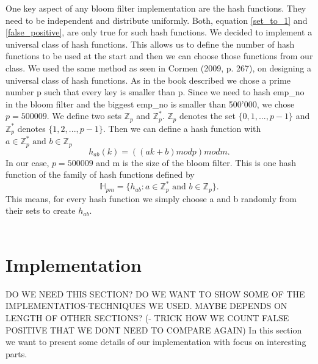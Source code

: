 \documentclass[12]{scrartcl}
\begin{document}
One key aspect of any bloom filter implementation are the hash functions. They need to be independent and distribute uniformly. Both, equation \ref{set_to_1} and \ref{false_positive}, are only true for such hash functions. We decided to implement a universal class of hash functions. This allows us to define the number of hash functions to be used at the start and then we can choose those functions from our class. We used the same method as seen in Cormen (2009, p. 267), on designing a universal class of hash functions. As in the book described we chose a prime number p such that every key is smaller than p. Since we need to hash emp\_no in the bloom filter and the biggest emp\_no is smaller than 500'000, we chose $p = 500009$. We define two sets $\mathbb{Z}_p$ and $\mathbb{Z}_p^*$. $\mathbb{Z}_p$ denotes the set $\{0,1,...,p-1\}$ and $\mathbb{Z}_p^*$ denotes $\{1,2,...,p-1\}$. Then we can define a hash function with $a \in \mathbb{Z}_p^* \text{ and } b \in \mathbb{Z}_p$
\begin{equation}
	h_{ab}(k) = ((ak + b) \mathrel{mod} p) \mathrel{mod} m.
\end{equation}
In our case, $p = 500009$ and m is the size of the bloom filter. This is one hash function of the family of hash functions defined by
\begin{equation}
\mathbb{H}_{pm} = \{h_{ab} \mathrel{:} a \in \mathbb{Z}_p^* \text{ and } b \in \mathbb{Z}_p\}.
\end{equation}
This means, for every hash function we simply choose a and b randomly from their sets to create $h_{ab}$.\\\\

\section{Implementation}
DO WE NEED THIS SECTION? DO WE WANT TO SHOW SOME OF THE IMPLEMENTATIOS-TECHNIQUES WE USED. MAYBE DEPENDS ON LENGTH OF OTHER SECTIONS? (- TRICK HOW WE COUNT FALSE POSITIVE THAT WE DONT NEED TO COMPARE AGAIN)
In this section we want to present some details of our implementation with focus on interesting parts.
\end{document}
